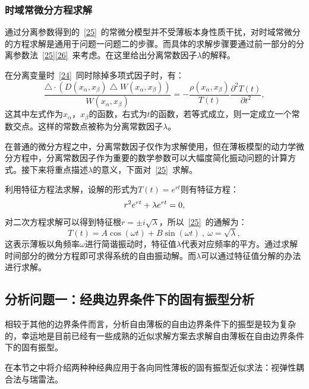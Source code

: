 \documentclass[withoutpreface,bwprint]{cumcmthesis} %
\begin{document}
\subsubsection{时域常微分方程求解}
通过分离参数得到的~\eqref{25}~的常微分模型并不受薄板本身性质干扰，对时域常微分的方程求解是通用于问题一问题二的步骤。而具体的求解步骤要通过前一部分的分离参数法~\eqref{25}\eqref{26}~来考虑。在这里给出分离常数因子$\lambda$的解释。

在分离变量时~\eqref{24}~同时除掉多项式因子时，有：
\begin{equation}
    \frac{\bigtriangleup\cdot\left(D\left(x_\alpha,x_\beta\right)\bigtriangleup W\left(x_\alpha,x_\beta\right)\right)}{W\left(x_\alpha,x_\beta\right)} = -\frac{\rho\left(x_\alpha,x_\beta\right)}{T(t)}\frac{\partial^2 T(t)}{\partial t^2}, \label{27}
\end{equation}
这其中左式作为$x_\alpha$，$x_\beta$的函数，右式为$t$的函数，若等式成立，则一定成立一个常数交点。这样的常数点被称为分离常数因子$\lambda$。

在普通的微分方程之中，分离常数因子仅作为求解使用，但在薄板模型的动力学微分方程中，分离常数因子作为重要的数学参数可以大幅度简化振动问题的计算方式。接下来将重点描述$\lambda$的意义，下面对~\eqref{25}~求解。

利用特征方程法求解，设解的形式为$T(t)=e^{rt}$则有特征方程：
\begin{equation}
    r^2e^{rt}+\lambda e^{rt}=0, \notag
\end{equation}
对二次方程求解可以得到特征根$r=\pm i\sqrt{\lambda}$，所以~\eqref{25}~的通解为：
\begin{equation}
    T(t)=A\cos(\omega t)+B\sin(\omega t)~,~\omega=\sqrt{\lambda}, \label{28}
\end{equation}
这表示薄板以角频率$\omega$进行简谐振动时，特征值$\lambda$代表对应频率的平方。通过求解时间部分的微分方程即可求得系统的自由振动解。而$\lambda$可以通过特征值分解的办法进行求解。
\subsection{分析问题一：经典边界条件下的固有振型分析}
相较于其他的边界条件而言，分析自由薄板的自由边界条件下的振型是较为复杂的，幸运地是目前已经有一些成熟的近似求解方案去求解自由薄板在自由边界条件下的固有振型。

在本节之中将介绍两种种经典应用于各向同性薄板的固有振型近似求法：视弹性耦合法与瑞雷法。
\end{document}
